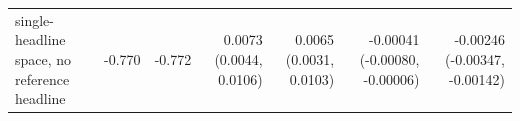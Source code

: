 \begin{tabular}{lrrrrrr}
single-headline space, no reference headline & -0.770 & -0.772 & 0.0073 (0.0044, 0.0106) & 0.0065 (0.0031, 0.0103) & -0.00041 (-0.00080, -0.00006) & -0.00246 (-0.00347, -0.00142) \\

\end{tabular}
